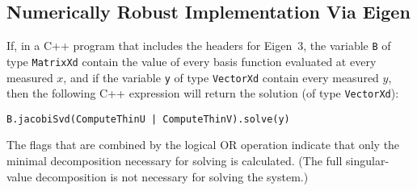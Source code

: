 \documentclass[twocolumn]{article}
\begin{document}
\subsection{Numerically Robust Implementation Via Eigen}

If, in a C++ program that includes the headers for Eigen~3, the variable
\texttt{B} of type \texttt{MatrixXd} contain the value of every basis function
evaluated at every measured $x$, and if the variable \texttt{y} of type
\texttt{VectorXd} contain every measured $y$, then the following C++ expression
will return the solution (of type \texttt{VectorXd}):
\begin{small}
\begin{verbatim}
B.jacobiSvd(ComputeThinU | ComputeThinV).solve(y)
\end{verbatim}
\end{small}
The flags that are combined by the logical OR operation indicate that only the
minimal decomposition necessary for solving is calculated. (The full
singular-value decomposition is not necessary for solving the system.)

%
%
%
%

\newpage


\end{document}
